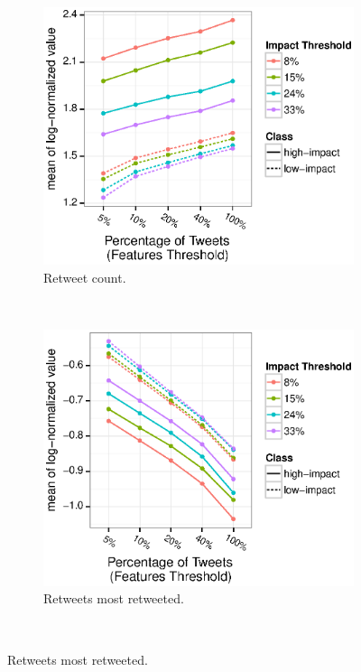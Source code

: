 \documentclass[10pt,letterpaper]{article}
\begin{document}
\begin{figure}
  \centering
  \begin{subfigure}[b]{0.45\textwidth}
    \includegraphics[width=\textwidth]{figures_SI/Plots_from_data/total_rt_count.eps}
    \caption{Retweet count.} \label{fig:feat_rt_count}
  \end{subfigure}
  ~ %
  \begin{subfigure}[b]{0.45\textwidth}
    \includegraphics[width=\textwidth]{figures_SI/Plots_from_data/retweets_most_retweeted.eps}
    \caption{Retweets most retweeted.} \label{fig:feat_rt_most_rt}
  \end{subfigure} ~ %


\end{figure}
\end{document}
